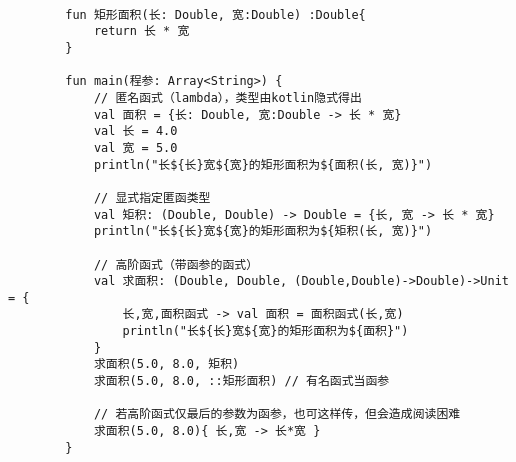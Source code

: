     \begin{verbatim}

        fun 矩形面积(长: Double, 宽:Double) :Double{
            return 长 * 宽
        }
        
        fun main(程参: Array<String>) {
            // 匿名函式（lambda），类型由kotlin隐式得出
            val 面积 = {长: Double, 宽:Double -> 长 * 宽}
            val 长 = 4.0
            val 宽 = 5.0
            println("长${长}宽${宽}的矩形面积为${面积(长, 宽)}")

            // 显式指定匿函类型
            val 矩积: (Double, Double) -> Double = {长, 宽 -> 长 * 宽}
            println("长${长}宽${宽}的矩形面积为${矩积(长, 宽)}")

            // 高阶函式（带函参的函式）
            val 求面积: (Double, Double, (Double,Double)->Double)->Unit = {
                长,宽,面积函式 -> val 面积 = 面积函式(长,宽)
                println("长${长}宽${宽}的矩形面积为${面积}")
            }
            求面积(5.0, 8.0, 矩积)
            求面积(5.0, 8.0, ::矩形面积) // 有名函式当函参

            // 若高阶函式仅最后的参数为函参，也可这样传，但会造成阅读困难
            求面积(5.0, 8.0){ 长,宽 -> 长*宽 }
        }
    \end{verbatim}





% 
% 